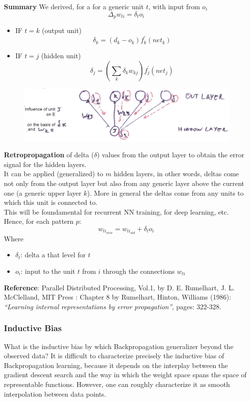 \documentclass[../main.tex]{subfiles}
\begin{document}
\noindent \textbf{Summary}
We derived, for a for a generic unit $t$, with input from $o_i$
$$ \Delta_p w_{ti} = \delta_t o_i$$
\begin{itemize}
    \item IF $t = k$ (output unit)\\
        $$\delta_k = (d_k - o_k)f_k^{'}(net_k)$$
    \item IF $t = j$ (hidden unit)\
        $$\delta_j = \left( \sum_{k}^{}\delta_k w_{kj} \right) f_j^{'}(net_j)$$
\end{itemize}
\begin{figure}[H]
    \centering
    \includegraphics[scale = 0.5]{lectures/4_neural_networks/4_retrop.png}
    \label{fig:4_retrop}
\end{figure}
\noindent\textbf{Retropropagation} of delta ($\delta$) values from the output layer to obtain the error signal for the hidden layers.\\
It can be applied (generalized) to $m$ hidden layers, in other words, deltas come not only from the output layer but also from any generic layer above the current one (a generic upper layer $k$). More in general the deltas come from any units to which this unit is connected to.\\
This will be foundamental for recurrent NN training, for deep learning, etc.
\noindent Hence, for each pattern $p$:
$$w_{ti_{new}} = w_{ti_{old}} + \delta_t o_i$$
Where
\begin{itemize}
    \item $\delta_t$: delta a that level for $t$
    \item $o_i$: input to the unit $t$ from $i$ through the connections $w_{ti}$
\end{itemize}

\textbf{Reference}: Parallel Distributed Processing, Vol.1, by D. E. Rumelhart, J. L. McClelland, MIT Press : Chapter 8 by Rumelhart, Hinton, Williams (1986): \textit{“Learning internal representations by error propagation”}, pages: 322-328.
\subsubsection{Inductive Bias}
What is the inductive bias by which Backpropagation generalizer beyond the observed data? It is difficult to characterize precisely the inductive bias of Backpropagation learning, because it depends on the interplay between the gradient descent search and the way in which the weight space spans the space of representable functions. However, one can roughly characterize it as smooth interpolation between data points.\\
\end{document}
